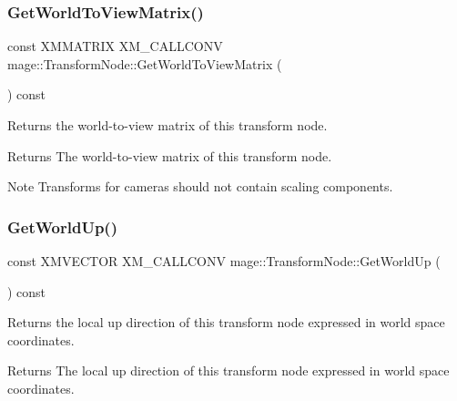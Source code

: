 \subsubsection{\texorpdfstring{Get\+World\+To\+View\+Matrix()}{GetWorldToViewMatrix()}}
{\footnotesize\ttfamily const X\+M\+M\+A\+T\+R\+IX X\+M\+\_\+\+C\+A\+L\+L\+C\+O\+NV mage\+::\+Transform\+Node\+::\+Get\+World\+To\+View\+Matrix (\begin{DoxyParamCaption}{ }\end{DoxyParamCaption}) const\hspace{0.3cm}{\ttfamily [noexcept]}}

Returns the world-\/to-\/view matrix of this transform node.

\begin{DoxyReturn}{Returns}
The world-\/to-\/view matrix of this transform node. 
\end{DoxyReturn}
\begin{DoxyNote}{Note}
Transforms for cameras should not contain scaling components. 
\end{DoxyNote}
\hypertarget{classmage_1_1_transform_node_acf4f03618f5e70314a71e65d968ec3f1}{}\label{classmage_1_1_transform_node_acf4f03618f5e70314a71e65d968ec3f1} 
\subsubsection{\texorpdfstring{Get\+World\+Up()}{GetWorldUp()}}
{\footnotesize\ttfamily const X\+M\+V\+E\+C\+T\+OR X\+M\+\_\+\+C\+A\+L\+L\+C\+O\+NV mage\+::\+Transform\+Node\+::\+Get\+World\+Up (\begin{DoxyParamCaption}{ }\end{DoxyParamCaption}) const\hspace{0.3cm}{\ttfamily [noexcept]}}

Returns the local up direction of this transform node expressed in world space coordinates.

\begin{DoxyReturn}{Returns}
The local up direction of this transform node expressed in world space coordinates. 
\end{DoxyReturn}
\hypertarget{classmage_1_1_transform_node_ab56e299f356ba599d468600ad2948120}{}\label{classmage_1_1_transform_node_ab56e299f356ba599d468600ad2948120} 
